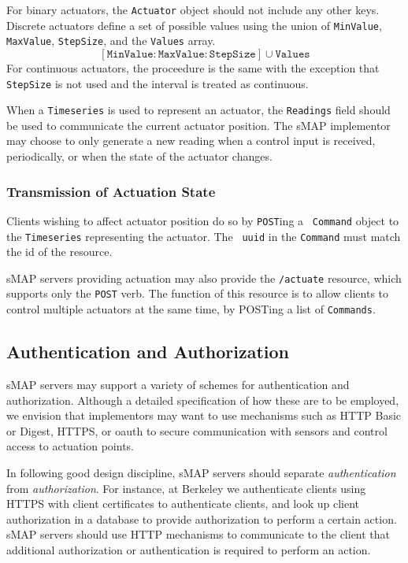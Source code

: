\documentclass[10pt,letterpaper]{article}
\newcommand{\smap}{sMAP}
\begin{document}


For binary actuators, the {\tt Actuator} object should not include any other
keys.  Discrete actuators define a set of possible values using the union of
{\tt MinValue}, {\tt MaxValue}, {\tt StepSize}, and the {\tt Values} array.
%
\[
[\mathrm{\texttt{MinValue}}:\mathrm{\texttt{MaxValue}}:\mathrm{\texttt{StepSize}}]
\cup \mathrm{\texttt{Values}}
\]
%
For continuous actuators, the proceedure is the same with the exception that
{\tt StepSize} is not used and the interval is treated as continuous.

When a {\tt Timeseries} is used to represent an actuator, the {\tt Readings}
field should be used to communicate the current actuator position.  The
\smap{} implementor may choose to only generate a new reading when a control
input is received, periodically, or when the state of the actuator changes.

\subsubsection{Transmission of Actuation State}

Clients wishing to affect actuator position do so by {\tt POST}ing a {\tt
  Command} object to the {\tt Timeseries} representing the actuator.  The {\tt
  uuid} in the {\tt Command} must match the id of the resource.

\smap{} servers providing actuation may also provide the {\tt /actuate}
resource, which supports only the {\tt POST} verb.  The function of this
resource is to allow clients to control multiple actuators at the same time,
by POSTing a list of {\tt Commands}.


\subsection{Authentication and Authorization}
\label{sec:auth}

\smap{} servers may support a variety of schemes for authentication and
authorization.  Although a detailed specification of how these are to be
employed, we envision that implementors may want to use mechanisms such as
HTTP Basic or Digest, HTTPS, or oauth to secure communication with sensors and
control access to actuation points.

In following good design discipline, \smap{} servers should separate {\it
  authentication} from {\it authorization}.  For instance, at Berkeley we
authenticate clients using HTTPS with client certificates to authenticate
clients, and look up client authorization in a database to provide
authorization to perform a certain action.  \smap{} servers should use HTTP
mechanisms to communicate to the client that additional authorization or
authentication is required to perform an action.
\end{document}
